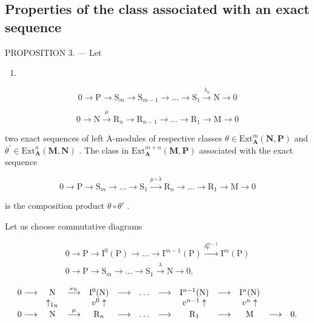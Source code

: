 \subsection{Properties of the class associated with an exact sequence}

PROPOSITION 3. — Let

\begin{enumerate}
\def\labelenumi{(\arabic{enumi})}
\setcounter{enumi}{5}
\tightlist
\item
\end{enumerate}

\[
0 \rightarrow \mathrm{P} \rightarrow \mathrm{S} _ {m} \rightarrow \mathrm{S} _ {m - 1} \rightarrow \dots \rightarrow \mathrm{S} _ {1} \stackrel {\lambda_ {n}} {\rightarrow} \mathrm{N} \rightarrow 0\tag{7}
\]

\[
0 \rightarrow \mathrm{N} \xrightarrow {\mu} \mathrm{R} _ {n} \rightarrow \mathrm{R} _ {n - 1} \rightarrow \dots \rightarrow \mathrm{R} _ {1} \rightarrow \mathrm{M} \rightarrow 0
\]

two exact sequences of left A-modules of respective classes \(\theta\in\mathrm{Ext}_{\mathbf{A}}^{m}(\mathbf{N},\mathbf{P})\) and \(\theta^{\prime}\in\mathrm{Ext}_{\mathbf{A}}^{n}(\mathbf{M},\mathbf{N})\) . The class in \(\mathrm{Ext}_{\mathbf{A}}^{m+n}(\mathbf{M},\mathbf{P})\) associated with the exact sequence

\[
0 \to \mathrm{P} \to \mathrm{S} _ {m} \to \dots \to \mathrm{S} _ {1} \xrightarrow {\mu \circ \lambda} \mathrm{R} _ {n} \to \dots \to \mathrm{R} _ {1} \to \mathrm{M} \to 0\tag{8}
\]

is the composition product \(\theta\circ\theta'\) .

Let us choose commutative diagrams

\[
\begin{array}{c} 0 \longrightarrow \mathrm{P} \longrightarrow \mathrm{I} ^ {0} (\mathrm{P}) \longrightarrow \dots \longrightarrow \mathrm{I} ^ {m - 1} (\mathrm{P}) \xrightarrow {\delta_ {\mathrm{P}} ^ {m - 1}} \mathrm{I} ^ {m} (\mathrm{P}) \\ 0 \longrightarrow \mathrm{P} \longrightarrow \mathrm{S} _ {m} \longrightarrow \dots \longrightarrow \mathrm{S} _ {1} \xrightarrow {\lambda} \mathrm{N} \longrightarrow 0, \end{array}
\]

\[
\begin{array}{c c c c c c c c c c c c} 0 \longrightarrow & \mathrm{N} & \stackrel {{e _ {\mathrm{N}}}} {{\longrightarrow}} & \mathrm{I} ^ {0} (\mathrm{N}) & \longrightarrow & \dots & \longrightarrow & \mathrm{I} ^ {n - 1} (\mathrm{N}) & \longrightarrow & \mathrm{I} ^ {n} (\mathrm{N}) \\ & \uparrow_ {1 _ {\mathrm{N}}} & & v ^ {0} \uparrow & & & & v ^ {n - 1} \uparrow & & v ^ {n} \uparrow \\ 0 \longrightarrow & \mathrm{N} & \stackrel {{\mu}} {{\longrightarrow}} & \mathrm{R} _ {n} & \longrightarrow & \dots & \longrightarrow & \mathrm{R} _ {1} & \longrightarrow & \mathrm{M} & \longrightarrow & 0. \end{array}
\]

